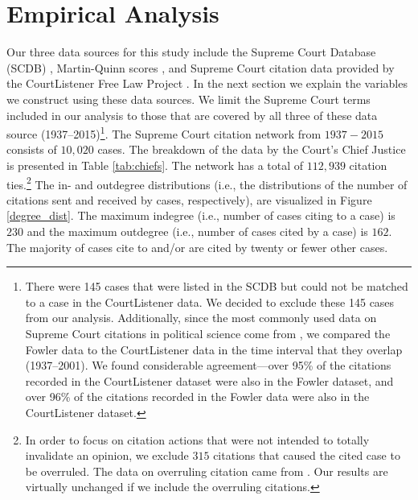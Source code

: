\documentclass{cup-pan}
\begin{document}
 \section{Empirical Analysis}
Our three data sources for this study include the Supreme Court Database (SCDB) \citep{spaeth2014supreme}, Martin-Quinn scores \citep{martin2002dynamic}, and Supreme Court citation data provided by the CourtListener Free Law Project \citep{CourtListener}. In the next section we explain the variables we construct using these data sources. We limit the Supreme Court terms included in our analysis to those that are covered by all three of these data source (1937--2015)\footnote{There were 145 cases that were listed in the SCDB but could not be matched to a case in the CourtListener data. We decided to exclude these 145 cases from our analysis. Additionally, since the most commonly used data on Supreme Court citations in political science come from \citet{fowler2007network}, we compared the Fowler data to the CourtListener data in the time interval that they overlap (1937--2001). We found considerable agreement---over 95\% of the citations recorded in the CourtListener dataset were also in the Fowler dataset, and over 96\% of the citations recorded in the Fowler data were also in the CourtListener dataset.}. The Supreme Court citation network from $1937 - 2015$ consists of $10,020$ cases. The breakdown of the data by the Court's Chief Justice is presented in Table \ref{tab:chiefs}. The network has a total of $112,939$ citation ties.\footnote{In order to focus on citation actions that were not intended to totally invalidate an opinion, we exclude $315$ citations that caused the cited case to be overruled. The data on overruling citation came from \citet{senate2016constitution}. Our results are virtually unchanged if we include the overruling citations.} The in- and outdegree distributions (i.e., the distributions of the number of citations sent and received by cases, respectively), are visualized in Figure \ref{degree_dist}. The maximum indegree (i.e., number of cases citing to a case) is $230$ and the maximum outdegree (i.e., number of cases cited by a case) is $162$. The majority of cases cite to and/or are cited by twenty or fewer other cases.
\end{document}
